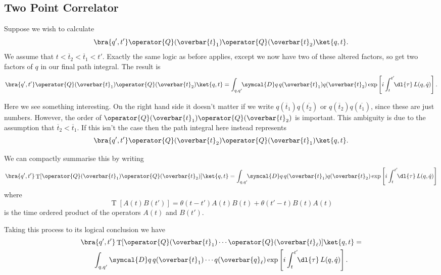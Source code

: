 \documentclass[fleqn]{NotesClass}
\newcommand{\lagrangian}{L}
\newcommand{\heaviside}{\theta}
\DeclareMathOperator{\timeOrdering}{T}
\newcommand{\DL}[1]{\symcal{D}#1}
\begin{document}
    \subsection{Two Point Correlator}
    Suppose we wish to calculate
    \begin{equation}
        \bra{q',t'} \operator{Q}(\overbar{t}_1)\operator{Q}(\overbar{t}_2)\ket{q,t}.
    \end{equation}
    We assume that \(t < \overbar{t}_2 < \overbar{t}_1 < t'\).
    Exactly the same logic as before applies, except we now have two of these altered factors, so get two factors of \(q\) in our final path integral.
    The result is
    \begin{equation}
        \bra{q',t'} \operator{Q}(\overbar{t}_1)\operator{Q}(\overbar{t}_2)\ket{q,t} = \int_{q,q'} \!\! \DL{q} \, q(\overbar{t}_1)q(\overbar{t}_2) \exp\left[ i\int_t^{t'} \!\! \dl{\tau} \, \lagrangian(q, \dot{q}) \right].
    \end{equation}

    Here we see something interesting.
    On the right hand side it doesn't matter if we write \(q(\overbar{t}_1)q(\overbar{t_2})\) or \(q(\overbar{t}_2)q(\overbar{t_1})\), since these are just numbers.
    However, the order of \(\operator{Q}(\overbar{t}_1)\operator{Q}(\overbar{t}_2)\) is important.
    This ambiguity is due to the assumption that \(\overbar{t}_2 < \overbar{t}_1\).
    If this isn't the case then the path integral here instead represents
    \begin{equation}
        \bra{q',t'} \operator{Q}(\overbar{t}_2)\operator{Q}(\overbar{t}_1)\ket{q,t}.
    \end{equation}
    
    We can compactly summarise this by writing
    \begin{equation}
        \bra{q',t'} \timeOrdering[\operator{Q}(\overbar{t}_1)\operator{Q}(\overbar{t}_2)]\ket{q,t} = \int_{q,q'} \!\! \DL{q} \, q(\overbar{t}_1)q(\overbar{t}_2) \exp\left[ i\int_t^{t'} \!\! \dl{\tau} \, \lagrangian(q, \dot{q}) \right]
    \end{equation}
    where
    \begin{equation}
        \timeOrdering[A(t)B(t')] = \heaviside(t - t')A(t)B(t) + \heaviside(t' - t)B(t)A(t)
    \end{equation}
    is the time ordered product of the operators \(A(t)\) and \(B(t')\).
    
    Taking this process to its logical conclusion we have
    \begin{multline}
        \bra{q',t'} \timeOrdering[\operator{Q}(\overbar{t}_1) \dotsm \operator{Q}(\overbar{t}_\ell)]\ket{q,t} =\\
        \int_{q,q'} \!\!\ \DL{q} \, q(\overbar{t}_1) \dotsm q(\overbar{q}_\ell) \exp\left[ i \int_t^{t'} \!\! \dl{\tau} \, \lagrangian(q, \dot{q}) \right].
    \end{multline}
    
    
    \appendixpage
    \begin{appendices}
        
        
    \end{appendices}
    
    \backmatter
    \renewcommand{\glossaryname}{Acronyms}
    \printglossary[acronym]
    \printindex
\end{document}
